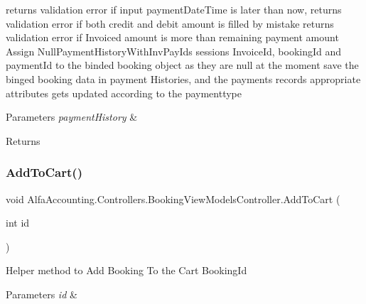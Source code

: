 returns validation error if input payment\+Date\+Time is later than now, returns validation error if both credit and debit amount is filled by mistake returns validation error if Invoiced amount is more than remaining payment amount Assign Null\+Payment\+History\+With\+Inv\+Pay\+Ids session\textquotesingle{}s Invoice\+Id, booking\+Id and payment\+Id to the binded booking object as they are null at the moment save the binged booking data in payment Histories, and the payments record\textquotesingle{}s appropriate attributes gets updated according to the paymenttype 


\begin{DoxyParams}{Parameters}
{\em payment\+History} & \\
\hline
\end{DoxyParams}
\begin{DoxyReturn}{Returns}

\end{DoxyReturn}
\mbox{\label{class_alfa_accounting_1_1_controllers_1_1_booking_view_models_controller_a741b6cc23c814a19db514ad186687986}} 
\subsubsection{\texorpdfstring{Add\+To\+Cart()}{AddToCart()}}
{\footnotesize\ttfamily void Alfa\+Accounting.\+Controllers.\+Booking\+View\+Models\+Controller.\+Add\+To\+Cart (\begin{DoxyParamCaption}\item[{int}]{id }\end{DoxyParamCaption})\hspace{0.3cm}{\ttfamily [private]}}



Helper method to Add Booking To the Cart Booking\+Id 


\begin{DoxyParams}{Parameters}
{\em id} & \\
\hline
\end{DoxyParams}
\mbox{\label{class_alfa_accounting_1_1_controllers_1_1_booking_view_models_controller_adf4a14a9683e52f9dff922c5e58bc125}} 
